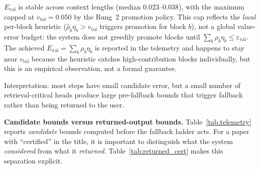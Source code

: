 \documentclass[10pt,twocolumn,a4paper]{article}
\theoremstyle{definition}
\theoremstyle{remark}
\begin{document}
$E_{\mathrm{val}}$ is stable across context lengths (median 0.023--0.038), with the maximum capped at $v_{\mathrm{tol}}{=}0.050$ by the Rung~2 promotion policy.  This cap reflects the \emph{local} per-block heuristic ($\hat{\rho}_b \eta_b > v_{\mathrm{tol}}$ triggers promotion for block $b$), not a global value-error budget: the system does not greedily promote blocks until $\sum_b \rho_b \eta_b \leq \varepsilon_{\mathrm{val}}$.  The achieved $E_{\mathrm{val}}{=}\sum_b \rho_b \eta_b$ is reported in the telemetry and happens to stay near $v_{\mathrm{tol}}$ because the heuristic catches high-contribution blocks individually, but this is an empirical observation, not a formal guarantee.

Interpretation: most steps have small candidate error, but a small number of retrieval-critical heads produce large pre-fallback bounds that trigger fallback rather than being returned to the user.

\textbf{Candidate bounds versus returned-output bounds.}  Table~\ref{tab:telemetry} reports \emph{candidate} bounds computed before the fallback ladder acts.  For a paper with ``certified'' in the title, it is important to distinguish what the system \emph{considered} from what it \emph{returned}.  Table~\ref{tab:returned_cert} makes this separation explicit.
\end{document}
